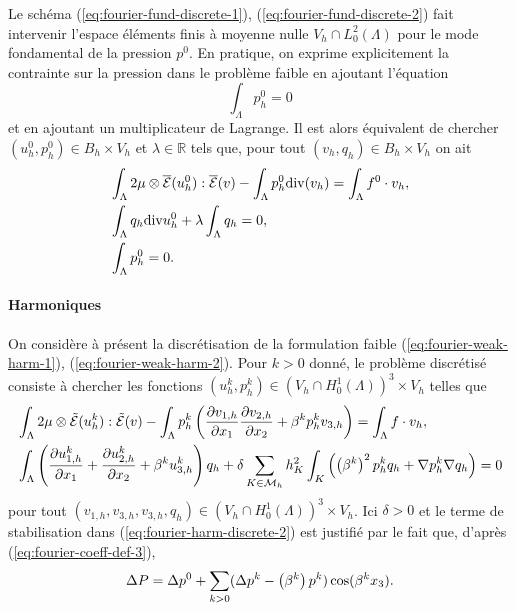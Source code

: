 Le schéma (\ref{eq:fourier-fund-discrete-1}),
(\ref{eq:fourier-fund-discrete-2}) fait intervenir l'espace
éléments finis à moyenne nulle $V_h \cap L^2_0(\Lambda)$ pour le mode
fondamental de la pression $p^0$. En pratique, on exprime
explicitement la contrainte sur la pression dans le problème faible
en ajoutant l'équation
\begin{equation}
\int_\Lambda p^0_h = 0
\end{equation}
et en ajoutant un multiplicateur de Lagrange. Il est alors équivalent
de chercher $(u^0_h, p^0_h)\in B_h\times V_h$ et
$\lambda\in\mathbb R$ tels que, pour tout $(v_h, q_h)\in
B_h\times V_h$ on ait
\begin{align}
  &\int_\Lambda
  2\mu\otimes\overline{\mathcal E}(u^0_h):\overline{\mathcal E}(v)
  -\int_\Lambda p^0_h\mathrm{div}(v_h) = \int_\Lambda f^0\cdot v_h, \label{eq:fourier-fund-discrete-1-prat}\\
  & \int_\Lambda q_h\mathrm{div} u^0_h + \lambda \int_\Lambda q_h =
  0,\label{eq:fourier-fund-discrete-2-prat}\\
  & \int_\Lambda p_h^0 = 0.\label{eq:fourier-fund-discrete-3-prat}
\end{align}

\paragraph{Harmoniques}
On considère à présent la discrétisation de la formulation
faible (\ref{eq:fourier-weak-harm-1}),
(\ref{eq:fourier-weak-harm-2}). Pour $k > 0$ donné, le problème
discrétisé consiste à chercher les fonctions $(u^k_h, p^k_h) \in
(V_h\cap H_0^1(\Lambda))^3\times V_h$ telles que
\begin{align}
  &\int_\Lambda 2\mu\otimes
  \tilde{\mathcal E}(u^k_h):\tilde{\mathcal E}(v) - \int_\Lambda
  p_h^k\left( \frac{\partial v_{1,h}}{\partial x_1}
    \frac{\partial v_{2,h}}{\partial x_2} +\beta^k p^k_h v_{3,h} \right) =
  \int_\Lambda f\cdot v_h,\label{eq:fourier-harm-discrete-1}\\
  &\int_\Lambda \left( \frac{\partial u^k_{1,h}}{\partial x_1} +
    \frac{\partial u^k_{2,h}}{\partial x_2} + \beta^k u^k_{3,h} \right)q_h +
  \delta \sum_{K\in\mathcal M_h} h_K^2
  \int_K\left( \left( \beta^k \right)^2 p^k_h q_h + \nabla p_h^k \nabla
    q_h \right) = 0\label{eq:fourier-harm-discrete-2}
\end{align}
pour tout $(v_{1,h}, v_{3,h}, v_{3,h}, q_h) \in (V_h\cap
H_0^1(\Lambda))^3\times V_h$. Ici $\delta > 0$ et le terme de
stabilisation dans (\ref{eq:fourier-harm-discrete-2}) est justifié
par le fait que, d'après (\ref{eq:fourier-coeff-def-3}),
\begin{equation}
  \Delta P = \Delta p^0 + \sum_{k > 0} (\Delta p^k -
  \left( \beta^k \right)p^k)\cos(\beta^k x_3).
\end{equation}

